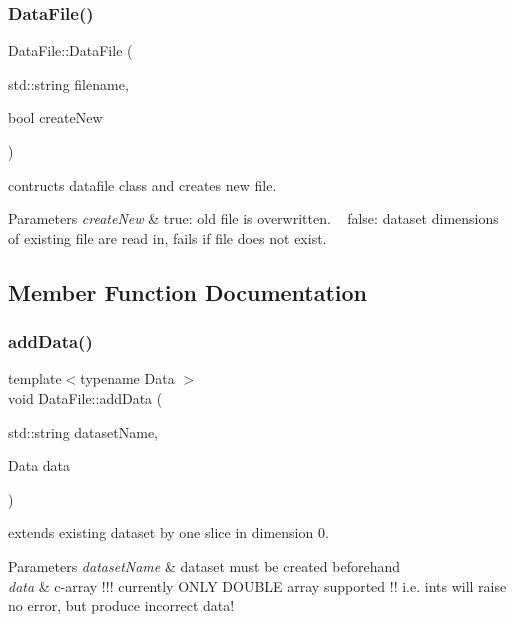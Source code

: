 \subsubsection{\texorpdfstring{Data\+File()}{DataFile()}}
{\footnotesize\ttfamily Data\+File\+::\+Data\+File (\begin{DoxyParamCaption}\item[{std\+::string}]{filename,  }\item[{bool}]{create\+New }\end{DoxyParamCaption})}

contructs datafile class and creates new file. 
\begin{DoxyParams}{Parameters}
{\em create\+New} & true\+: old file is overwritten. ~\newline
 false\+: dataset dimensions of existing file are read in, fails if file does not exist. \\
\hline
\end{DoxyParams}


\subsection{Member Function Documentation}
\mbox{\label{classDataFile_a51739c09c99007a2cd3faa960efd45ed}} 
\subsubsection{\texorpdfstring{add\+Data()}{addData()}}
{\footnotesize\ttfamily template$<$typename Data $>$ \\
void Data\+File\+::add\+Data (\begin{DoxyParamCaption}\item[{std\+::string}]{dataset\+Name,  }\item[{Data}]{data }\end{DoxyParamCaption})}

extends existing dataset by one slice in dimension 0. 
\begin{DoxyParams}{Parameters}
{\em dataset\+Name} & dataset must be created beforehand \\
\hline
{\em data} & c-\/array !!! currently O\+N\+LY D\+O\+U\+B\+LE array supported !! i.\+e. ints will raise no error, but produce incorrect data! \\
\hline
\end{DoxyParams}
\mbox{\label{classDataFile_a6da2338acc382d3538d53f5747e46b21}} 
